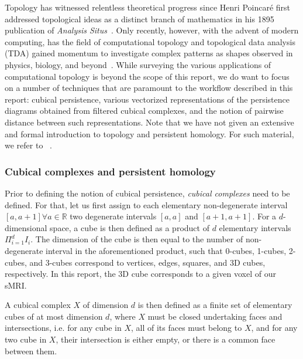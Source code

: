 \documentclass{article}
\begin{document}
Topology has witnessed relentless theoretical progress since Henri Poincaré first addressed topological ideas as a distinct branch of mathematics in his 1895 publication of \textit{Analysis Situs}~\citep{poincare1895analysis, james1999history}. Only recently, however, with the advent of modern computing, has the field of computational topology and topological data analysis (TDA) gained momentum to investigate complex patterns as shapes observed in physics, biology, and beyond~\citep{ghrist2008barcodes, dey1999computational, amezquita2020shape}. While surveying the various applications of computational topology is beyond the scope of this report, we do want to focus on a number of techniques that are paramount to the workflow described in this report: cubical persistence, various vectorized representations of the persistence diagrams obtained from filtered cubical complexes, and the notion of pairwise distance between such representations. Note that we have not given an extensive and formal introduction to topology and persistent homology. For such material, we refer to ~\citep{freedman2009algebraic, edelsbrunner2010computational, ghrist2008barcodes}.


\subsubsection{Cubical complexes and persistent homology}

Prior to defining the notion of cubical persistence, \emph{cubical complexes} need to be defined. For that, let us first assign to each elementary non-degenerate interval $[a,a+1]\forall a\in\mathbb{R}$ two degenerate intervals $[a,a]$ and $[a+1,a+1]$. For a $d$-dimensional space, a cube is then defined as a product of $d$ elementary intervals $\Pi_{i=1}^{d}I_i$. The dimension of the cube is then equal to the number of non-degenerate interval in the aforementioned product, such that 0-cubes, 1-cubes, 2-cubes, and 3-cubes correspond to vertices, edges, squares, and 3D cubes, respectively. In this report, the 3D cube corresponds to a given voxel of our sMRI.

A cubical complex $X$ of dimension $d$ is then defined as a finite set of elementary cubes of at most dimension $d$, where $X$ must be closed undertaking faces and intersections, i.e. for any cube in $X$, all of its faces must belong to $X$, and for any two cube in $X$, their intersection is either empty, or there is a common face between them.
\end{document}
